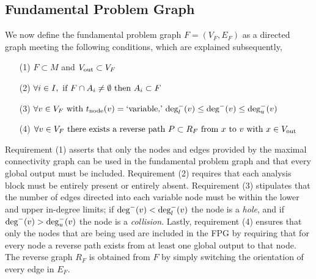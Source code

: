 \subsection{Fundamental Problem Graph}
    \label{ss:FPG}
    We now define the fundamental problem graph $F=(V_F,E_F)$ as a directed graph meeting the following conditions, which are explained subsequently,
    \begin{enumerate}
    \item[(1)] $F \subset M$ and $V_\textrm{out} \subset V_F$
    \item[(2)] $\displaystyle{\forall i \in I, \textrm{ if } F \cap A_i \neq \emptyset \textrm{ then } A_i \subset F}$
    \item[(3)] $\displaystyle{\forall v \in V_F \textrm{ with } t_\textrm{node}(v) = \textrm{`variable,'} \  \textrm{deg}_l^-(v) \leq \textrm{deg}^-(v) \leq \textrm{deg}_u^-(v)}$
    \item[(4)] $\displaystyle{\forall v \in V_F \textrm{ there exists a reverse path } P \subset R_F \textrm{ from } x \textrm{ to } v \textrm{ with } x\in V_\textrm{out}}$
    \end{enumerate}
    Requirement (1) asserts that only the nodes and edges provided by the maximal connectivity graph can be used in the fundamental problem graph and that every global output must be included. 
    Requirement (2) requires that each analysis block must be entirely present or entirely absent. 
    Requirement (3) stipulates that the number of edges directed into each variable node must be within the lower and upper in-degree limits; 
    if $\textrm{deg}^-(v) < \textrm{deg}_l^-(v)$ the node is a \emph{hole}, and if $\textrm{deg}^-(v) > \textrm{deg}_u^-(v)$ the node is a \emph{collision}.
    Lastly, requirement (4) ensures that only the nodes that are being used are included in the FPG by requiring that for every node a reverse path exists from at least one global output to that node. 
    The reverse graph $R_F$ is obtained from $F$ by simply switching the orientation of every edge in $E_F$.


